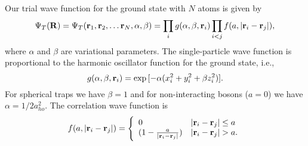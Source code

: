 \documentclass[10pt]{article}
\begin{document}
 Our trial wave function for the ground state with $N$ atoms is given by
 \begin{equation}
 \Psi_T({\bf R})=\Psi_T({\bf r}_1, {\bf r}_2, \dots {\bf r}_N,\alpha,\beta)=\prod_i g(\alpha,\beta,{\bf r}_i)\prod_{i<j}f(a,|{\bf r}_i-{\bf r}_j|),
 \label{eq:trialwf}
 \end{equation}
 where $\alpha$ and $\beta$ are variational parameters. The
 single-particle wave function is proportional to the harmonic
 oscillator function for the ground state, i.e.,
 \begin{equation}
    g(\alpha,\beta,{\bf r}_i)= \exp{[-\alpha(x_i^2+y_i^2+\beta z_i^2)]}.
 \end{equation}
 For spherical traps we have $\beta = 1$ and for non-interacting
 bosons ($a=0$) we have $\alpha = 1/2a_{ho}^2$.  The correlation wave
 function is
 \begin{equation}
    f(a,|{\bf r}_i-{\bf r}_j|)=\Bigg\{
 \begin{array}{ll}
	 0 & {|{\bf r}_i-{\bf r}_j|} \leq {a}\\
	 (1-\frac{a}{|{\bf r}_i-{\bf r}_j|}) & {|{\bf r}_i-{\bf r}_j|} > {a}.
 \end{array}
 \end{equation}  
\end{document}
